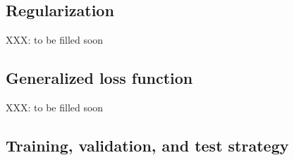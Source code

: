 %
%





\iffalse

\subsection{Regularization}

XXX: to be filled soon

\subsection{Generalized loss function}

XXX: to be filled soon


\subsection{Training, validation, and test strategy}

